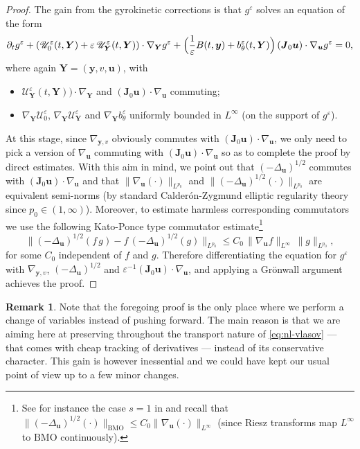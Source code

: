\documentclass[JEP,XML,SOM,Unicode]{cedram}
\let\mathcal\mathscr
\let\eps\varepsilon
\let\d\partial
\theoremstyle{plain}
\theoremstyle{definition}
\newtheorem{remark}[theorem]{Remark}
\newcommand\br{\begin{remark}}
\newcommand\er{\end{remark}}
\newcommand\bJ{{\boldsymbol J}}
\newcommand\bY{{\boldsymbol Y}}
\newcommand\bfu{{\boldsymbol u}}
\newcommand\bfy{{\boldsymbol y}}
\newcommand\cU{{\mathcal U}}
\begin{document}
\begin{proof}
The gain from the gyrokinetic corrections is that $g^\eps$ solves an equation of the form
\[
\d_tg^\eps+(\cU_0^\eps(t,\bY)
+\eps\,\cU_\bY^\eps(t,\bY))\cdot\nabla_\bY g^\eps
+\Bigl(\frac1\eps B(t,\bfy)+b_\theta^\eps(t,\bY)\Bigr)\,(\bJ_0\bfu)\cdot\nabla_\bfu g^\eps=0,
\]
where again $\bY=(\bfy,v,\bfu)$, with
\begin{itemize}
\item $\cU_\bY^\eps(t,\bY))\cdot\nabla_\bY$ and $(\bJ_0\bfu)\cdot\nabla_\bfu$ commuting;
\item $\nabla_\bY\cU_0^\eps$, $\nabla_{\bY}\cU_\bY^\eps$ and $\nabla_{\bY}b_\theta^\eps$ uniformly bounded in $L^\infty$ (on the support of $g^\eps$).
\end{itemize}
At this stage, since $\nabla_{\bfy,v}$ obviously commutes with $(\bJ_0\bfu)\cdot\nabla_\bfu$, we only need to pick a version of $\nabla_\bfu$ commuting with $(\bJ_0\bfu)\cdot\nabla_\bfu$ so as to complete the proof by direct estimates. With this aim in mind, we point out that $(-\Delta_{\bfu})^{1/2}$ commutes with $(\bJ_0\bfu)\cdot\nabla_\bfu$ and that $\|\nabla_\bfu(\cdot)\|_{L^{p_0}}$ and $\|(-\Delta_{\bfu})^{1/2}(\cdot)\|_{L^{p_0}}$ are equivalent semi-norms (by standard Calderón-Zygmund elliptic regularity theory since $p_0\in(1,\infty)$). Moreover, to estimate harmless corresponding commutators we use the following Kato-Ponce type commutator estimate\footnote{See for instance the case $s=1$ in \cite[Th.\,5.1]{Li_Kato-Ponce} and recall that $\|(-\Delta_{\bfu})^{1/2}(\cdot)\|_\mathrm{BMO}\leq C_0 \|\nabla_{\bfu}(\cdot)\|_{L^\infty}$ (since Riesz transforms map $L^\infty$ to $\mathrm{BMO}$ continuously).}
\[
\|(-\Delta_{\bfu})^{1/2}(f\,g)-f\,(-\Delta_{\bfu})^{1/2}(g)\|_{L^{p_0}}
\leq C_0\,\|\nabla_\bfu f\|_{L^\infty}\,\|g\|_{L^{p_0}},
\]
for some $C_0$ independent of $f$ and $g$. Therefore differentiating the equation for $g^\eps$ with $\nabla_{\bfy,v}$, $(-\Delta_{\bfu})^{1/2}$ and $\eps^{-1}(\bJ_0\bfu)\cdot\nabla_\bfu$, and applying a Grönwall argument achieves the proof.
\end{proof}

\br
Note that the foregoing proof is the only place where we perform a change of variables instead of pushing forward. The main reason is that we are aiming here at preserving throughout the transport nature of \eqref{eq:nl-vlasov} --- that comes with cheap tracking of derivatives --- instead of its conservative character. This gain is however inessential and we could have kept our usual point of view up to a few minor changes.
\er
\end{document}
